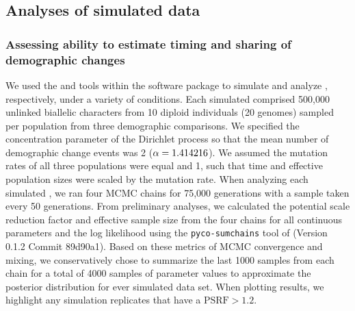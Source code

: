 
\subsection{Analyses of simulated data}

\subsubsection{Assessing ability to estimate timing and sharing of demographic changes}

We used the \simcoevolity and \ecoevolity tools within the \ecoevolity software
package
\citep{Oaks2018ecoevolity}
to simulate and analyze \datasets, respectively, under a variety of conditions.
Each simulated \dataset comprised 500,000 unlinked biallelic characters from 10
diploid individuals (20 genomes) sampled per population from three demographic
comparisons.
We specified the concentration parameter of the Dirichlet process so that the
mean number of demographic change events was 2 ($\alpha = 1.414216$).
We assumed the mutation rates of all three populations were equal and 1, such
that time and effective population sizes were scaled by the mutation rate.
When analyzing each simulated \dataset, we ran four MCMC chains for 75,000
generations with a sample taken every 50 generations.
From preliminary analyses, we calculated the potential scale reduction factor
\citep[PSRF; the square root of Equation 1.1 in][]{Brooks1998} and effective
sample size \citep[ESS;][]{Gong2014} from the four chains for all continuous
parameters and the log likelihood using the \texttt{pyco-sumchains} tool of
\pycoevolity (Version 0.1.2 Commit 89d90a1).
Based on these metrics of MCMC convergence and mixing, we conservatively chose
to summarize the last 1000 samples from each chain for a total of 4000 samples
of parameter values to approximate the posterior distribution for ever
simulated data set.
When plotting results, we highlight any simulation replicates that have a
$\textrm{PSRF} > 1.2$.


